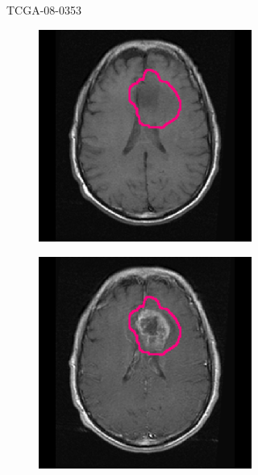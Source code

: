\begin{subappendices}
\begin{figure}[htbp]
\begin{subfigure}[b]{0.8\textwidth}
\begin{subfigure}[b]{0.215\textwidth}
        \end{subfigure}
        \caption{TCGA-08-0353}
    \end{subfigure}
    \begin{subfigure}[b]{0.8\textwidth}
        \centering
        \hfill
        \begin{subfigure}[b]{0.215\textwidth}
        \includegraphics[width=\textwidth, clip, trim=2.5cm 0.5cm 2.5cm 0.5cm]{Figures/Random_segs/T1_TCGA-12-1094.png}
        \end{subfigure}
        \hfill
        \begin{subfigure}[b]{0.215\textwidth}
        \includegraphics[width=\textwidth, clip, trim=2.5cm 0.5cm 2.5cm 0.5cm]{Figures/Random_segs/T1GD_TCGA-12-1094.png}

\end{subfigure}
\end{subfigure}
\end{figure}
\end{subappendices}
